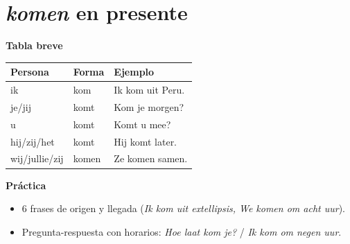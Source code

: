 \section{\textit{komen} en presente}
\textbf{Tabla breve}
\begin{center}
\begin{tabular}{lll}
\toprule
Persona & Forma & Ejemplo \\
\midrule
ik & kom & Ik kom uit Peru. \\
je/jij & komt & Kom je morgen? \\
u & komt & Komt u mee? \\
hij/zij/het & komt & Hij komt later. \\
wij/jullie/zij & komen & Ze komen samen. \\
\bottomrule
\end{tabular}
\end{center}

\textbf{Práctica}
\begin{itemize}[leftmargin=*]
  \item 6 frases de origen y llegada (\textit{Ik kom uit	extellipsis{}, We komen om acht uur}).
  \item Pregunta-respuesta con horarios: \textit{Hoe laat kom je?} / \textit{Ik kom om negen uur}.
\end{itemize}

